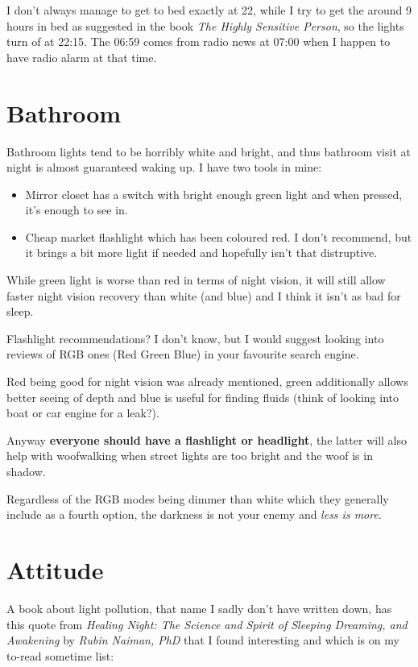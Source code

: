\documentclass[a4paper]{rapport3}
\begin{document}
I don't always manage to get to bed exactly at 22, while I try to get the around 9 hours in bed as suggested in the book \textit{The Highly Sensitive Person}, so the lights turn of at 22:15.
The 06:59 comes from radio news at 07:00 when I happen to have radio alarm at that time.

\chapter{Bathroom}

Bathroom lights tend to be horribly white and bright, and thus bathroom visit at night is almost guaranteed waking up. I have two tools in mine:

\begin{itemize}
    \item Mirror closet has a switch with bright enough green light and when pressed, it's enough to see in.
    \item Cheap market flashlight which has been coloured red. I don't recommend, but it brings a bit more light if needed and hopefully isn't that distruptive.
\end{itemize}

While green light is worse than red in terms of night vision, it will still allow faster night vision recovery than white (and blue) and I think it isn't as bad for sleep.

Flashlight recommendations? I don't know, but I would suggest looking into reviews of RGB ones (Red Green Blue) in your favourite search engine.

Red being good for night vision was already mentioned, green additionally allows better seeing of depth and blue is useful for finding fluids (think of looking into boat or car engine for a leak?).

Anyway \textbf{everyone should have a flashlight or headlight}, the latter will also help with woofwalking when street lights are too bright and the woof is in shadow.

Regardless of the RGB modes being dimmer than white which they generally include as a fourth option, the darkness is not your enemy and \textit{less is more}.

\chapter{Attitude}

A book about light pollution, that name I sadly don't have written down, has this quote from \textit{Healing Night: The Science and Spirit of Sleeping Dreaming, and Awakening} by \textit{Rubin Naiman, PhD} that I found interesting and which is on my to-read sometime list:
\end{document}

